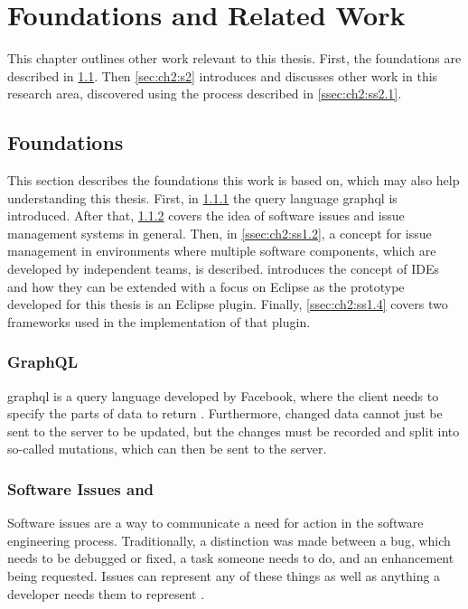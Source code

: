 
\chapter{Foundations and Related Work}
\label{chap:ch2}
This chapter outlines other work relevant to this thesis.
First, the foundations are described in \cref{sec:ch2:s1}.
Then \cref{sec:ch2:s2} introduces and discusses other work in this research area, 
discovered using the process described in \cref{ssec:ch2:ss2.1}.

\section{Foundations}
\label{sec:ch2:s1}
This section describes the foundations this work is based on, which may also help understanding this thesis.
First, in \cref{ssec:ch2:ss1.0} the query language \gls{graphql} is  introduced.
After that, \cref{ssec:ch2:ss1.1} covers the idea of software issues and issue management systems in general.
Then, in \cref{ssec:ch2:ss1.2}, a concept for issue management in environments where multiple software components, 
which are developed by independent teams, is described.
 introduces the concept of \glspl{IDE} and how they can be extended 
with a focus on \gls{Eclipse} as the prototype developed for this thesis is an \gls{Eclipse} plugin.
Finally, \cref{ssec:ch2:ss1.4} covers two frameworks used in the implementation of that plugin.

\subsection{GraphQL}
\label{ssec:ch2:ss1.0}
\gls{graphql} is a query language developed by Facebook, where the client needs to specify the parts of data to return \cite{grpahql2018}.
Furthermore, changed data cannot just be sent to the server to be updated, but the changes must be recorded and split into so-called mutations,
which can then be sent to the server.

\subsection{Software Issues and }
\label{ssec:ch2:ss1.1}
Software issues are a way to communicate a need for action in the software engineering process.
Traditionally, a distinction was made between a bug, which needs to be debugged or fixed, a task someone needs to do, 
and an enhancement being requested.
Issues can represent any of these things as well as anything a developer needs them to represent \cite{Atlassian2020Issue,Github2020Issues}.

